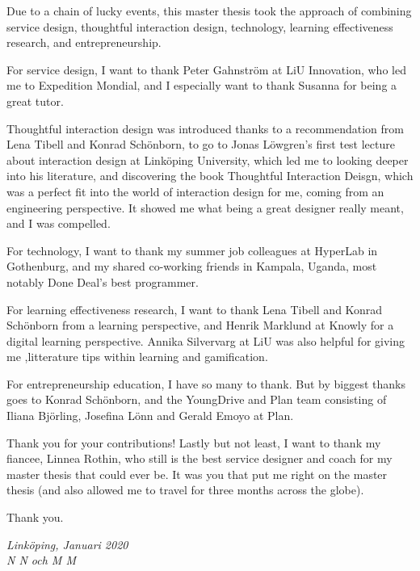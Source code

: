 \begin{acknowledgments}

  Due to a chain of lucky events, this master thesis took the approach of combining service design, thoughtful interaction design, technology, learning effectiveness research, and entrepreneurship.

For service design, I want to thank Peter Gahnström at LiU Innovation, who led me to Expedition Mondial, and I especially want to thank Susanna for being a great tutor.

Thoughtful interaction design was introduced thanks to a recommendation from Lena Tibell and Konrad Schönborn, to go to Jonas Löwgren's first test lecture about interaction design at Linköping University, which led me to looking deeper into his literature, and discovering the book Thoughtful Interaction Deisgn, which was a perfect fit into the world of interaction design for me, coming from an engineering perspective. It showed me what being a great designer really meant, and I was compelled.

For technology, I want to thank my summer job colleagues at HyperLab in Gothenburg, and my shared co-working friends in Kampala, Uganda, most notably Done Deal's best programmer.

For learning effectiveness research, I want to thank Lena Tibell and Konrad Schönborn from a learning perspective, and Henrik Marklund at Knowly for a digital learning perspective. Annika Silvervarg at LiU was also helpful for giving me ,litterature tips within learning and gamification.

For entrepreneurship education, I have so many to thank. But by biggest thanks goes to Konrad Schönborn, and the YoungDrive and Plan team consisting of Iliana Björling, Josefina Lönn and Gerald Emoyo at Plan.

Thank you for your contributions! Lastly but not least, I want to thank my fiancee, Linnea Rothin, who still is the best service designer and coach for my master thesis that could ever be. It was you that put me right on the master thesis (and also allowed me to travel for three months across the globe).

Thank you.


  \addvspace{1em}
  \begin{flushright}
    \textit{%
      Linköping, Januari 2020\\
      N N och M M%
    }
  \end{flushright}
\end{acknowledgments}
